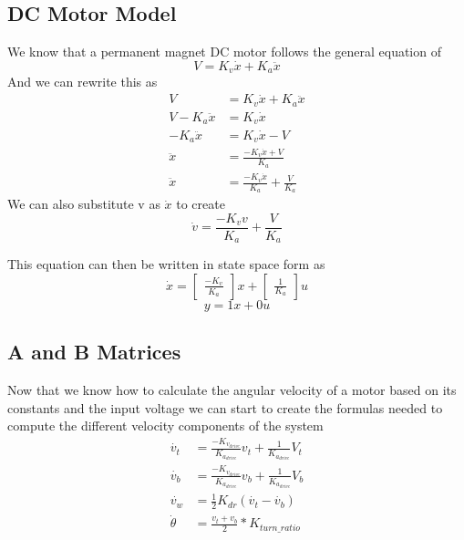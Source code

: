 \documentclass{scrartcl}
\begin{document}
\subsection{DC Motor Model}
We know that a permanent magnet DC motor follows the general equation of
\begin{equation}
    V = K_v\dot{x} + K_a\ddot{x}
\end{equation}
And we can rewrite this as
\begin{align*}
    V               & = K_v\dot{x} + K_a\ddot{x}                \\
    V - K_a\ddot{x} & = K_v\dot{x}                              \\
    -K_a\ddot{x}    & = K_v\dot{x} - V                          \\
    \ddot{x}        & = \frac{-K_v\dot{x} + V}{K_a}             \\
    \ddot{x}        & = \frac{-K_v\dot{x}}{K_a} + \frac{V}{K_a}
\end{align*}
We can also substitute v as \(\dot{x}\) to create
\begin{equation}
    \dot{v} = \frac{-K_v v}{K_a} + \frac{V}{K_a}
\end{equation}

This equation can then be written in state space form as
\begin{equation}
    \dot{x} = \begin{bmatrix}\frac{-K_v}{K_a}\end{bmatrix}x + \begin{bmatrix}\frac{1}{K_a}\end{bmatrix}u
\end{equation}
\begin{equation}
    y = 1x + 0u
\end{equation}

\subsection{A and B Matrices}
Now that we know how to calculate the angular velocity of a motor based on its constants and the input voltage we can start to create the formulas needed to compute the different velocity components of the system
\begin{align}
    \dot{v_t}    & = \frac{-K_{v_\mathit{drive}}}{K_{a_\mathit{drive}}}v_t + \frac{1}{K_{a_\mathit{drive}}}V_t \\
    \dot{v_b}    & = \frac{-K_{v_\mathit{drive}}}{K_{a_\mathit{drive}}}v_b + \frac{1}{K_{a_\mathit{drive}}}V_b \\
    \dot{v_w}    & = \frac{1}{2}K_\mathit{dr}(\dot{v_t} - \dot{v_b}) \label{wheel_accel}                       \\
    \dot{\theta} & = \frac{v_t + v_b}{2} * K_\mathit{turn\_ratio}
\end{align}
\end{document}
